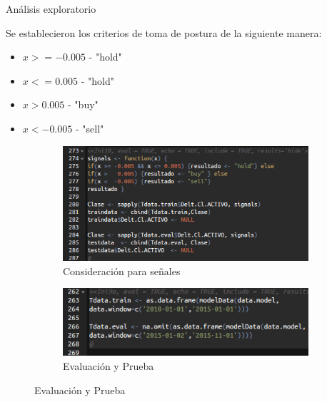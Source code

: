 \documentclass{bredelebeamer}
\begin{document}
\begin{frame}{An\'alisis exploratorio}

Se establecieron los criterios de toma de postura de la siguiente manera:

\begin{itemize}

  \item $ x >= -0.005 $ - "hold" 
  \item $ x <= 0.005 $ - "hold" 
  \item $ x >   0.005$ - "buy" 
  \item $ x <  -0.005$ - "sell"

\end{itemize}

\begin{figure}
\centering
\begin{subfigure}{.5\textwidth}
  \centering
  \includegraphics[width=.9\linewidth]{images/Codigo3.png}
  \caption{Consideraci\'on para se\~nales }
\end{subfigure}%
\begin{subfigure}{.5\textwidth}
  \centering
  \includegraphics[width=1.1\linewidth]{images/Codigo4.png}
  \caption{Evaluaci\'on y Prueba}
\end{subfigure}
\end{figure}

  
\end{frame}

\end{document}
